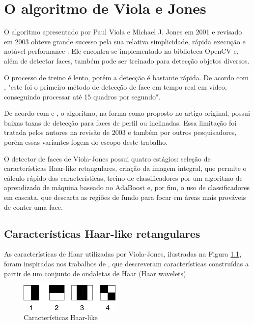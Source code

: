\chapter{O algoritmo de Viola e Jones}\label{cap:viola_jones}

O algoritmo apresentado por Paul Viola e Michael J. Jones em 2001 \cite{Viola01rapidobject} \cite{viola2004robust} e revisado em 2003 \cite{jones2003fast} obteve grande sucesso pela sua relativa simplicidade, rápida execução e notável performance \cite{jensen2008implementing}. Ele encontra-se implementado na biblioteca OpenCV \cite{bradski2000intel} \cite{opencvdocs} e, além de detectar faces, também pode ser treinado para detecção objetos diversos.

O processo de treino é lento, porém a detecção é bastante rápida. De acordo com , "este foi o primeiro método de detecção de face em tempo real em vídeo, conseguindo processar até 15 quadros por segundo".

De acordo com \cite{zhang2010survey} e \cite{Viola01rapidobject}, o algoritmo, na forma como proposto no artigo original, possui baixas taxas de detecção para faces de perfil ou inclinadas. Essa limitação foi tratada pelos autores na revisão de 2003 \cite{jones2003fast} e também por outros pesquisadores, porém essas variantes fogem do escopo deste trabalho.

O detector de faces de Viola-Jones possui quatro estágios: seleção de características Haar-like retangulares, criação da imagem integral, que permite o cálculo rápido das características, treino de classificadores por um algoritmo de aprendizado de máquina baseado no AdaBoost e, por fim, o uso de classificadores em cascata, que descarta as regiões de fundo para focar em áreas mais prováveis de conter uma face.


\section{Características Haar-like retangulares}\label{sec:haar_features}

As características de Haar utilizadas por Viola-Jones, ilustradas na Figura \ref{fig:haar_like_features}, foram inspiradas nos trabalhos de , que descreveram características construídas a partir de um conjunto de ondaletas de Haar (Haar wavelets).

\begin{figure}[htbp]
   \begin{center}
     \includegraphics{imagens/haar_like_features.png}
   \end{center}
   \caption{Características Haar-like \label{fig:haar_like_features}}
\end{figure}

